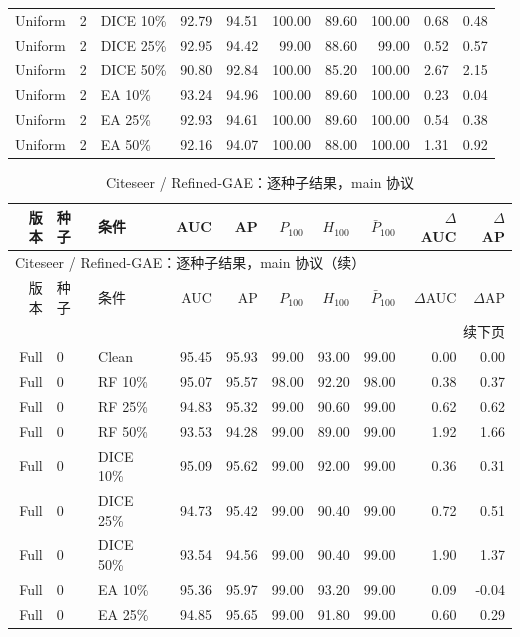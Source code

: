 {\begin{longtable}{rllrrrrrrr}
Uniform & 2 & DICE 10\% & 92.79 & 94.51 & 100.00 & 89.60 & 100.00 & 0.68 & 0.48 \\
Uniform & 2 & DICE 25\% & 92.95 & 94.42 & 99.00 & 88.60 & 99.00 & 0.52 & 0.57 \\
Uniform & 2 & DICE 50\% & 90.80 & 92.84 & 100.00 & 85.20 & 100.00 & 2.67 & 2.15 \\
Uniform & 2 & EA 10\% & 93.24 & 94.96 & 100.00 & 89.60 & 100.00 & 0.23 & 0.04 \\
Uniform & 2 & EA 25\% & 92.93 & 94.61 & 100.00 & 89.60 & 100.00 & 0.54 & 0.38 \\
Uniform & 2 & EA 50\% & 92.16 & 94.07 & 100.00 & 88.00 & 100.00 & 1.31 & 0.92 \\
\end{longtable}
}

{\footnotesize
\setlength{\tabcolsep}{3.2pt}
\renewcommand{\arraystretch}{1.10}
\begin{longtable}{rllrrrrrrr}
\caption{Citeseer / Refined-GAE：逐种子结果，main 协议}\\
\toprule
版本 & 种子 & 条件 & AUC & AP & $P_{100}$ & $H_{100}$ & $\bar P_{100}$ & $\Delta$AUC & $\Delta$AP \\
\midrule
\endfirsthead
\multicolumn{10}{l}{Citeseer / Refined-GAE：逐种子结果，main 协议（续）}\\
\toprule
版本 & 种子 & 条件 & AUC & AP & $P_{100}$ & $H_{100}$ & $\bar P_{100}$ & $\Delta$AUC & $\Delta$AP \\
\midrule
\endhead
\midrule\multicolumn{10}{r}{续下页}\\
\endfoot
\bottomrule
\endlastfoot
Full & 0 & Clean & 95.45 & 95.93 & 99.00 & 93.00 & 99.00 & 0.00 & 0.00 \\
Full & 0 & RF 10\% & 95.07 & 95.57 & 98.00 & 92.20 & 98.00 & 0.38 & 0.37 \\
Full & 0 & RF 25\% & 94.83 & 95.32 & 99.00 & 90.60 & 99.00 & 0.62 & 0.62 \\
Full & 0 & RF 50\% & 93.53 & 94.28 & 99.00 & 89.00 & 99.00 & 1.92 & 1.66 \\
Full & 0 & DICE 10\% & 95.09 & 95.62 & 99.00 & 92.00 & 99.00 & 0.36 & 0.31 \\
Full & 0 & DICE 25\% & 94.73 & 95.42 & 99.00 & 90.40 & 99.00 & 0.72 & 0.51 \\
Full & 0 & DICE 50\% & 93.54 & 94.56 & 99.00 & 90.40 & 99.00 & 1.90 & 1.37 \\
Full & 0 & EA 10\% & 95.36 & 95.97 & 99.00 & 93.20 & 99.00 & 0.09 & -0.04 \\
Full & 0 & EA 25\% & 94.85 & 95.65 & 99.00 & 91.80 & 99.00 & 0.60 & 0.29 \\

\end{longtable}}
